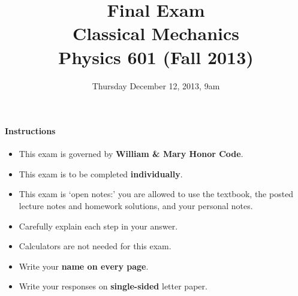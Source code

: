 \documentclass[letterpaper,11pt]{article}
\title{Final Exam \\ Classical Mechanics \\ Physics 601 (Fall 2013)}
\date{Thursday December 12, 2013, 9am}
\begin{document}
\maketitle

\paragraph*{Instructions}
\begin{itemize}
 \item This exam is governed by \textbf{William \& Mary Honor Code}.
 \item This exam is to be completed \textbf{individually}.
 \item This exam is `open notes:' you are allowed to use the textbook, the posted lecture notes and homework solutions, and your personal notes.
 \item Carefully explain each step in your answer.
 \item Calculators are not needed for this exam.
 \item Write your \textbf{name on every page}.
 \item Write your responses on \textbf{single-sided} letter paper.
\end{itemize}

\pagebreak
\end{document}

